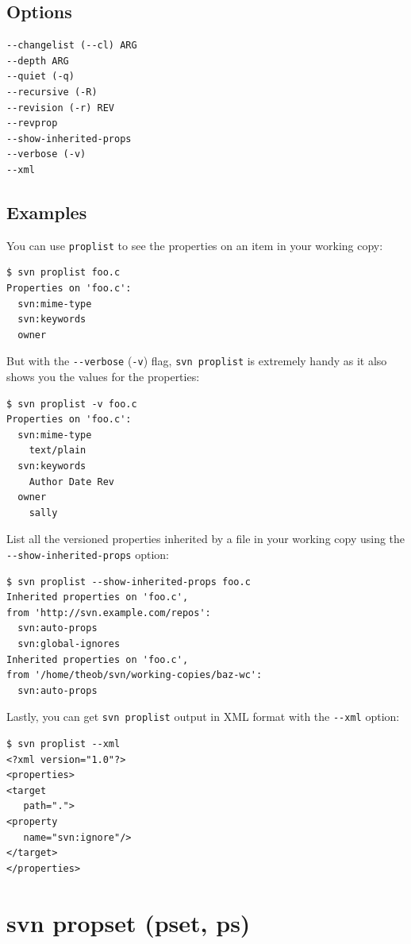 \subsection{Options}

\begin{verbatim}
--changelist (--cl) ARG
--depth ARG
--quiet (-q)
--recursive (-R)
--revision (-r) REV
--revprop
--show-inherited-props
--verbose (-v)
--xml
\end{verbatim}

\subsection{Examples}

You can use \texttt{proplist} to see the properties on an item in your
working copy:

\begin{verbatim}
$ svn proplist foo.c
Properties on 'foo.c':
  svn:mime-type
  svn:keywords
  owner
\end{verbatim}

But with the \texttt{-\/-verbose} (\texttt{-v}) flag,
\texttt{svn\ proplist} is extremely handy as it also shows you the
values for the properties:

\begin{verbatim}
$ svn proplist -v foo.c
Properties on 'foo.c':
  svn:mime-type
    text/plain
  svn:keywords
    Author Date Rev
  owner
    sally
\end{verbatim}

List all the versioned properties inherited by a file in your working
copy using the \texttt{-\/-show-inherited-props} option:

\begin{verbatim}
$ svn proplist --show-inherited-props foo.c
Inherited properties on 'foo.c',
from 'http://svn.example.com/repos':
  svn:auto-props
  svn:global-ignores
Inherited properties on 'foo.c',
from '/home/theob/svn/working-copies/baz-wc':
  svn:auto-props
\end{verbatim}

Lastly, you can get \texttt{svn\ proplist} output in XML format with the
\texttt{-\/-xml} option:

\begin{verbatim}
$ svn proplist --xml 
<?xml version="1.0"?>
<properties>
<target
   path=".">
<property
   name="svn:ignore"/>
</target>
</properties>
\end{verbatim}

\section{svn propset (pset, ps)}\label{svn.ref.svn.c.propset}

